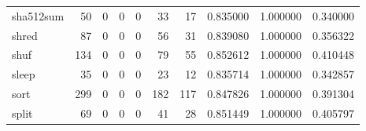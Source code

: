 \begin{longtable}{lrrrrrrrrr}
sha512sum &                                        50 &                                                  0 &                                                  0 &                                                  0 &                                                 33 &                                                 17 &                                           0.835000 &                               1.000000 &                             0.340000 \\
shred     &                                        87 &                                                  0 &                                                  0 &                                                  0 &                                                 56 &                                                 31 &                                           0.839080 &                               1.000000 &                             0.356322 \\
shuf      &                                       134 &                                                  0 &                                                  0 &                                                  0 &                                                 79 &                                                 55 &                                           0.852612 &                               1.000000 &                             0.410448 \\
sleep     &                                        35 &                                                  0 &                                                  0 &                                                  0 &                                                 23 &                                                 12 &                                           0.835714 &                               1.000000 &                             0.342857 \\
sort      &                                       299 &                                                  0 &                                                  0 &                                                  0 &                                                182 &                                                117 &                                           0.847826 &                               1.000000 &                             0.391304 \\
split     &                                        69 &                                                  0 &                                                  0 &                                                  0 &                                                 41 &                                                 28 &                                           0.851449 &                               1.000000 &                             0.405797 \\

\end{longtable}

